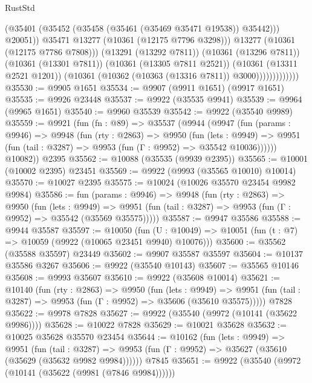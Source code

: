 \begin{lexlean}{RustStd}
\begin{coremodule}
                                  (@35401 (@35452 (@35458 (@35461 (@35469 @35471 @19538)) @35442)))
                                  @20051))
                              @35471
                              @13277
                              (@10361 (@12175 @7796 @3298)))
                            @13277
                            (@10361 (@12175 @7786 @7808)))
                          (@13291 (@13292 @7811))
                          (@10361 (@13296 @7811))
                          (@10361 (@13301 @7811))
                          (@10361 (@13305 @7811 @2521))
                          (@10361 (@13311 @2521 @1201))
                          (@10361 (@10362 (@10363 (@13316 @7811)) @3000)))))))))))))
@35530 := @9905 @1651
@35534 := @9907 (@9911 @1651) (@9917 @1651)
@35535 := @9926 @23448
@35537 := @9922 (@35535 @9941)
@35539 := @9964 (@9965 @1651)
@35540 := @9960 @35539
@35542 := @9922 (@35540 @9989)
@35559 := @9921
    (fun (fn : @89) =>
    @35537
      (@9944
        (@9947
          (fun (params : @9946) =>
          @9948
            (fun (rty : @2863) =>
            @9950
              (fun (lets : @9949) =>
              @9951 (fun (tail : @3287) => @9953 (fun (Γ : @9952) => @35542 @10036))))))
        @10082))
    @2395
@35562 := @10088 (@35535 (@9939 @2395))
@35565 := @10001 (@10002 @2395) @23451
@35569 := @9922 (@9993 (@35565 @10010) @10014)
@35570 := @10027 @2395
@35575 := @10024 (@10026 @35570 @23454 @9982 @9984)
@35586 := fun (params : @9946) =>
  @9948
    (fun (rty : @2863) =>
    @9950
      (fun (lets : @9949) =>
      @9951 (fun (tail : @3287) => @9953 (fun (Γ : @9952) => @35542 (@35569 @35575)))))
@35587 := @9947 @35586
@35588 := @9944 @35587
@35597 := @10050
    (fun (U : @10049) => @10051 (fun (t : @7) => @10059 (@9922 (@10065 @23451 @9940) @10076)))
@35600 := @35562 (@35588 @35597) @23449
@35602 := @9907 @35587 @35597
@35604 := @10137 @35586 @3267
@35606 := @9922 (@35540 @10143)
@35607 := @35565 @10146
@35608 := @9993 @35607
@35610 := @9922 (@35608 @10014)
@35621 := @10140
    (fun (rty : @2863) =>
    @9950
      (fun (lets : @9949) =>
      @9951 (fun (tail : @3287) => @9953 (fun (Γ : @9952) => @35606 (@35610 @35575)))))
    @7828
@35622 := @9978 @7828
@35627 := @9922 (@35540 (@9972 (@10141 (@35622 @9986))))
@35628 := @10022 @7828
@35629 := @10021 @35628
@35632 := @10025 @35628 @35570 @23454
@35644 := @10162
    (fun (lets : @9949) =>
    @9951
      (fun (tail : @3287) =>
      @9953 (fun (Γ : @9952) => @35627 (@35610 (@35629 (@35632 @9982 @9984))))))
    @7845
@35651 := @9922 (@35540 (@9972 (@10141 (@35622 (@9981 (@7846 @9984))))))

\end{coremodule}
\end{lexlean}
